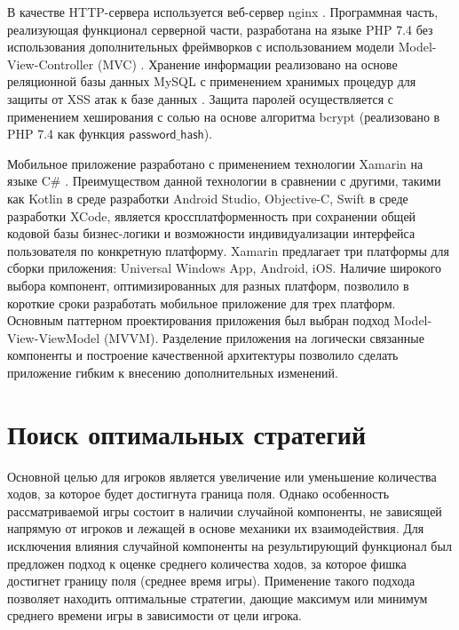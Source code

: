 В качестве HTTP-сервера используется веб-сервер nginx \cite{reese_nginx_2008}. Программная часть, реализующая функционал серверной части, разработана на языке PHP 7.4 \cite{Nixon_web_2016} без использования дополнительных фреймворков с использованием модели Model-View-Controller (MVC) \cite{pitt_pro_2021}. Хранение информации реализовано на основе реляционной базы данных MySQL с применением хранимых процедур для защиты от XSS атак к базе данных \cite{stuttard_web_2011}. Защита паролей осуществляется с применением хеширования с солью на основе алгоритма bcrypt (реализовано в PHP 7.4 как функция $\mathsf{password\_hash}$).


Мобильное приложение разработано с применением технологии Xamarin на языке C$\mathsf{\#}$ \cite{sole_xamarin_2022}. Преимуществом данной технологии в сравнении с другими, такими как Kotlin в среде разработки Android Studio, Objective-C, Swift в среде разработки XCode, является кроссплатформенность при сохранении общей кодовой базы бизнес-логики и возможности индивидуализации интерфейса пользователя по конкретную платформу. Xamarin предлагает три платформы для сборки приложения: Universal Windows App, Android, iOS. Наличие широкого выбора компонент, оптимизированных для разных платформ, позволило в короткие сроки разработать мобильное приложение для трех платформ. Основным паттерном проектирования приложения был выбран подход Model-View-ViewModel (MVVM). Разделение приложения на логически связанные компоненты и построение качественной архитектуры позволило сделать приложение гибким к внесению дополнительных изменений.


\section{Поиск оптимальных стратегий}\label{sec:ch3/sec3}

Основной целью для игроков является увеличение или уменьшение количества ходов, за которое будет достигнута граница поля. Однако особенность рассматриваемой игры состоит в наличии случайной компоненты, не зависящей напрямую от игроков и лежащей в основе механики их взаимодействия. Для исключения влияния случайной компоненты на результирующий функционал был предложен подход к оценке среднего количества ходов, за которое фишка достигнет границу поля (среднее время игры). Применение такого подхода позволяет находить оптимальные стратегии, дающие максимум или минимум среднего времени игры в зависимости от цели игрока.

